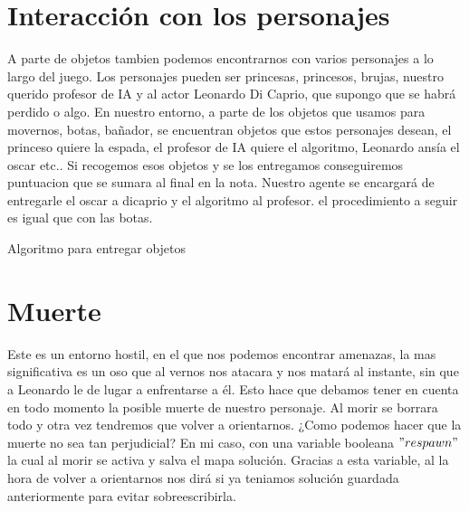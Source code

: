 \documentclass[10pt,a4paper,spanish]{article}
\begin{document}
\section{Interacción con los personajes}

A parte de objetos tambien podemos encontrarnos con varios personajes a lo largo del juego. Los personajes pueden ser princesas, princesos, brujas, nuestro querido profesor de IA y al actor Leonardo Di Caprio, que supongo que se habrá perdido o algo. En nuestro entorno, a parte de los objetos que usamos para movernos, botas, bañador, se encuentran objetos que estos personajes desean, el princeso quiere la espada, el profesor de IA quiere el algoritmo, Leonardo ansía el oscar etc.. Si recogemos esos objetos y se los entregamos conseguiremos puntuacion que se sumara al final en la nota. Nuestro agente se encargará de entregarle el oscar a dicaprio y el algoritmo al profesor. el procedimiento a seguir es igual que con las botas.

\begin{algorithm}[H]
\SetAlgoLined

\caption{Algoritmo para entregar objetos}
\end{algorithm}

\section{Muerte}

Este es un entorno hostil, en el que nos podemos encontrar amenazas, la mas significativa es un oso que al vernos nos atacara y nos matará al instante, sin que a Leonardo le de lugar a enfrentarse a él.
Esto hace que debamos tener en cuenta en todo momento la posible muerte de nuestro personaje. Al morir se borrara todo y otra vez tendremos que volver a orientarnos. ¿Como podemos hacer que la muerte no sea tan perjudicial?
En mi caso, con una variable booleana $"respawn"$ la cual al morir se activa y salva el mapa solución. Gracias a esta variable, al la hora de volver a orientarnos nos dirá si ya teniamos solución guardada anteriormente para evitar sobreescribirla.

\newpage

\ClearShipoutPicture
\end{document}
